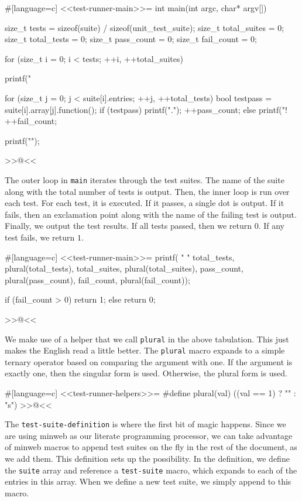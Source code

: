 #[language=c]
<<test-runner-main>>=
int main(int argc, char* argv[])
{
    size_t tests = sizeof(suite) / sizeof(unit_test_suite);
    size_t total_suites = 0;
    size_t total_tests = 0;
    size_t pass_count = 0;
    size_t fail_count = 0;

    for (size_t i = 0; i < tests; ++i, ++total_suites)
    {
        printf("%

        for (size_t j = 0; j < suite[i].entries; ++j, ++total_tests)
        {
            bool testpass = suite[i].array[j].function();
            if (testpass)
            {
                printf(".");
                ++pass_count;
            }
            else
            {
                printf("!%
                ++fail_count;
            }
        }

        printf("\n");
    }
>>@<<

The outer loop in \verb/main/ iterates through the test suites. The name of the
suite along with the total number of tests is output. Then, the inner loop is
run over each test. For each test, it is executed. If it passes, a single dot is
output. If it fails, then an exclamation point along with the name of the
failing test is output.  Finally, we output the test results.  If all tests
passed, then we return $0$. If any test fails, we return $1$.

#[language=c]
<<test-runner-main>>=
    printf(
        "\nRan %
        "%
        total_tests, plural(total_tests), total_suites, plural(total_suites),
        pass_count, plural(pass_count), fail_count, plural(fail_count));

    if (fail_count > 0)
        return 1;
    else
        return 0;
}
>>@<<

We make use of a helper that we call \verb/plural/ in the above tabulation. This
just makes the English read a little better.  The \verb/plural/ macro expands to
a simple ternary operator based on comparing the argument with one. If the
argument is exactly one, then the singular form is used. Otherwise, the plural
form is used.

#[language=c]
<<test-runner-helpers>>=
#define plural(val) ((val == 1) ? "" : "s")
>>@<<

The \verb/test-suite-definition/ is where the first bit of magic happens. Since
we are using minweb as our literate programming processor, we can take advantage
of minweb macros to append test suites on the fly in the rest of the document,
as we add them.  This definition sets up the possibility.  In the definition, we
define the \verb/suite/ array and reference a \verb/test-suite/ macro, which
expands to each of the entries in this array.  When we define a new test suite,
we simply append to this macro.

